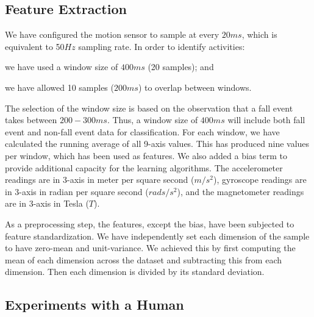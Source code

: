 \documentclass[letterpaper]{article}
\begin{document}
\begin{sloppy}
\subsection{Feature Extraction}

We  have configured the motion sensor to sample at every  $20ms$, which is equivalent to 50$Hz$ 
sampling rate. In order to 
identify activities: \begin{inparaenum}[1)] \item we have used a window size of $400ms$ (20 
samples); and \item we have allowed 10 samples ($200ms$) to overlap between windows. 
\end{inparaenum} The selection of the window size is based on the observation that a fall event 
takes between $200-300ms$. Thus, a window size of $400ms$ will include both fall event and 
non-fall event data for classification. For each window, we have calculated the running average of 
all 9-axis values. This has produced nine values per window, which has been used as features. We 
also added a bias term to provide additional capacity for the learning algorithms. The  
accelerometer readings are in 3-axis in meter per square second ($m/s^2$), gyroscope readings are 
in 3-axis in radian per square second ($rads/s^2$), and the magnetometer readings are in 3-axis in 
Tesla ($T$). 

As a preprocessing step, the features, except the bias, have been subjected to feature 
standardization. We have independently set each dimension of the sample  to have zero-mean and 
unit-variance. We achieved this by first computing the mean of each dimension across the dataset and 
subtracting this from each dimension. Then each dimension is divided by its standard deviation.
 

\subsection{Experiments with a Human}



\end{sloppy}
\end{document}

